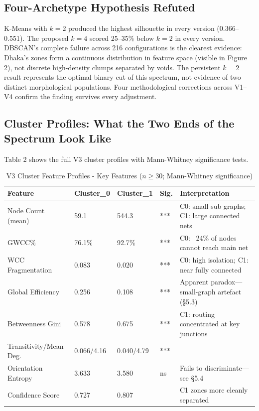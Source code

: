 \documentclass[sigconf, nonacm]{acmart}
\begin{document}
\subsection{Four-Archetype Hypothesis Refuted}

K-Means with $k = 2$ produced the highest silhouette in every version (0.366--0.551). The proposed $k = 4$ scored 25--35\% below $k = 2$ in every version. DBSCAN's complete failure across 216 configurations is the clearest evidence: Dhaka's zones form a continuous distribution in feature space (visible in Figure 2), not discrete high-density clumps separated by voids. The persistent $k = 2$ result represents the optimal binary cut of this spectrum, not evidence of two distinct morphological populations. Four methodological corrections across V1--V4 confirm the finding survives every adjustment.

\subsection{Cluster Profiles: What the Two Ends of the Spectrum Look Like}
Table 2 shows the full V3 cluster profiles with Mann-Whitney significance tests.

\begin{table}[t]
\caption{V3 Cluster Feature Profiles - Key Features ($n\ge30$; Mann-Whitney significance)}
\begin{tabular}{p{2.5cm}llll}
\toprule
Feature & Cluster\_0 & Cluster\_1 & Sig. & Interpretation \\
\midrule
Node Count (mean) & 59.1 & 544.3 & *** & C0: small sub-graphs; C1: large connected nets \\
GWCC\% & 76.1\% & 92.7\% & *** & C0: ~24\% of nodes cannot reach main net \\
WCC Fragmentation & 0.083 & 0.020 & *** & C0: high isolation; C1: near fully connected \\
Global Efficiency & 0.256 & 0.108 & *** & Apparent paradox---small-graph artefact (§5.3) \\
Betweenness Gini & 0.578 & 0.675 & *** & C1: routing concentrated at key junctions \\
Transitivity/Mean Deg. & 0.066/4.16 & 0.040/4.79 & *** &  \\
Orientation Entropy & 3.633 & 3.580 & ns & Fails to discriminate---see §5.4 \\
Confidence Score & 0.727 & 0.807 & & C1 zones more cleanly separated \\
\bottomrule
\end{tabular}
\end{table}
\end{document}
